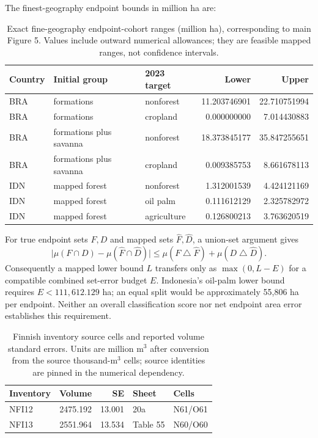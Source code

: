 The finest-geography endpoint bounds in million ha are:
\begin{table}[htbp]
\centering\small
\caption{Exact fine-geography endpoint-cohort ranges (million ha), corresponding to main Figure 5. Values include outward numerical allowances; they are feasible mapped ranges, not confidence intervals.}\label{tab:SI_conversion_exact}
\begin{tabularx}{\textwidth}{lllrr}\toprule
Country & Initial group & 2023 target & Lower & Upper\\\midrule
BRA & formations & nonforest & 11.203746901 & 22.710751994\\
BRA & formations & cropland & 0.000000000 & 7.014430883\\
BRA & formations plus savanna & nonforest & 18.373845177 & 35.847255651\\
BRA & formations plus savanna & cropland & 0.009385753 & 8.661678113\\
IDN & mapped forest & nonforest & 1.312001539 & 4.424121169\\
IDN & mapped forest & oil palm & 0.111612129 & 2.325782972\\
IDN & mapped forest & agriculture & 0.126800213 & 3.763620519\\
\bottomrule\end{tabularx}
\end{table}


For true endpoint sets $F,D$ and mapped sets $\widehat F,\widehat D$, a union-set argument gives
\[
\bigl|\mu(F\cap D)-\mu(\widehat F\cap\widehat D)\bigr|
\le\mu(F\mathbin{\triangle}\widehat F)+\mu(D\mathbin{\triangle}\widehat D).
\]
Consequently a mapped lower bound $L$ transfers only as $\max(0,L-E)$ for a compatible combined set-error budget $E$. Indonesia's oil-palm lower bound requires $E<111,612.129$ ha; an equal split would be approximately 55,806 ha per endpoint. Neither an overall classification score nor net endpoint area error establishes this requirement.

\begin{table}[htbp]
\centering\small
\caption{Finnish inventory source cells and reported volume standard errors. Units are million m$^3$ after conversion from the source thousand-m$^3$ cells; source identities are pinned in the numerical dependency.}\label{tab:SI_inventory_cells}
\begin{tabularx}{\textwidth}{lrrll}\toprule
Inventory & Volume & SE & Sheet & Cells\\\midrule
NFI12 & 2475.192 & 13.001 & 20a & N61/O61\\
NFI13 & 2551.964 & 13.534 & Table 55 & N60/O60\\
\bottomrule\end{tabularx}
\end{table}


